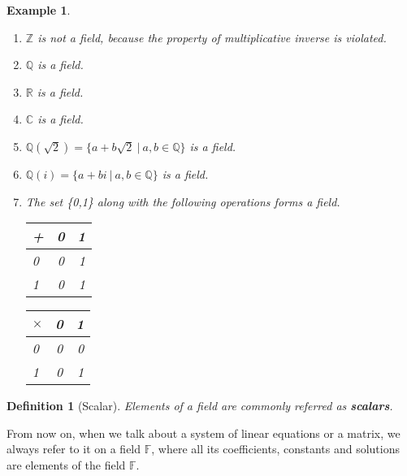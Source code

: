 \documentclass{article}
\newtheorem{definition}{Definition}[section] %
\newtheorem{example}{Example}[section]
\begin{document}
\begin{example} \
    \begin{enumerate}
        \item $\mathbb{Z}$ is not a field, because the property of \textit{multiplicative inverse} is violated.
        \item $\mathbb{Q}$ is a field.
        \item $\mathbb{R}$ is a field.
        \item $\mathbb{C}$ is a field.
        \item $\mathbb{Q}(\sqrt{2})=\{a+b\sqrt{2} \ |\ a,b \in \mathbb{Q} \}$ is a field.
        \item $\mathbb{Q}(i)=\{a+bi \ |\ a,b \in \mathbb{Q} \}$ is a field.
        \item The set \{0,1\} along with the following operations forms a field.
        \begin{multicols}{2}
            \noindent
            \begin{tabular}{l|cr}
                + & 0 & 1 \\
                \hline
                0 & 0 & 1 \\
                1 & 0 & 1
            \end{tabular}
            
            \columnbreak
            
            \noindent
            \begin{tabular}{l|cr}
                $\times$ & 0 & 1 \\
                \hline
                0 & 0 & 0 \\
                1 & 0 & 1
        \end{tabular}
        \end{multicols}
    \end{enumerate}
\end{example}

\begin{definition}[Scalar]
    Elements of a field are commonly referred as \textbf{scalars}.
\end{definition}

From now on, when we talk about a system of linear equations or a matrix, we always refer to it on a field $\mathbb{F}$, where all its coefficients, constants and solutions are elements of the field $\mathbb{F}$.
\end{document}
